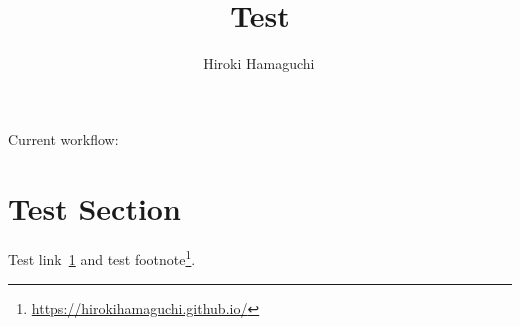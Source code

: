 \documentclass[11pt]{article}
\begin{document}
\title{Test}

\author[1]{Hiroki Hamaguchi\,}
\date{}

\maketitle

Current workflow: 

\section{Test Section}\label{sec:test_section}

Test link~\ref{sec:test_section} and test footnote\footnote{\url{https://hirokihamaguchi.github.io/}}.\\
\end{document}
